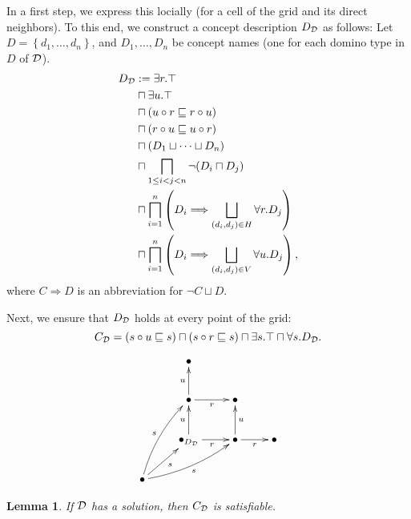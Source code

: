 \documentclass[openany]{scrbook}
\theoremstyle{break}
\newtheorem{Lemma}[Theorem]{Lemma}
\theoremstyle{nonumberbreak}
\theoremstyle{nonumberplain}
\theoremstyle{nonumberbreak}
\newcommand{\then}{\Longrightarrow}
\newcommand{\set}[1]{\left\{#1\right\}}
\begin{document}
In a first step, we express this locially (for a cell of the grid and
its direct neighbors). To this end, we construct a concept description
$D_{\cal D}$ as follows:
 Let $D = \set{d_1, \dotsc, d_n}$, and $D_1, \dotsc, D_n$ be concept
 names (one for each domino type in $D$ of ${\cal D}$).
 \begin{align*}
   D_{\cal D} & := \exists r.\top \\
   & \sqcap \exists u.\top \\
   & \sqcap (u \circ r \sqsubseteq r \circ u) \\
   & \sqcap (r \circ u \sqsubseteq u \circ r) \\
   & \sqcap (D_1 \sqcup \dotsb \sqcup D_n) \\
   & \sqcap \bigsqcap_{1 \leq i < j < n} \neg(D_i \sqcap D_j) \\
   & \sqcap \bigsqcap_{i = 1}^n \left(D_i \then \bigsqcup_{(d_i, d_j) \in
     H} \forall r. D_j\right) \\
   & \sqcap \bigsqcap_{i = 1}^n\left(D_i \then \bigsqcup_{(d_i, d_j)
       \in V} \forall u. D_j\right),
 \end{align*}
 where $C \then D$ is an abbreviation for $\neg C \sqcup D$.

 Next, we ensure that $D_{\cal D}$ holds at every point of the grid:
 \begin{equation*}
   C_{\cal D} = (s \circ u \sqsubseteq s) \sqcap (s \circ r
   \sqsubseteq s) \sqcap \exists s.\top \sqcap \forall s. D_{\cal D}.
 \end{equation*}

 \begin{equation*}
   \xymatrix{ & \bullet \\
     & \bullet \ar[u]^{u} \ar[r]_{r} & \bullet\\
     & \bullet_{D_{\cal D}} \ar[u]^{u} \ar[r]_{r} & \bullet \ar[u]_{u}
     \ar[r]_{r} & \bullet \\
   \bullet \ar[ur]_{s} \ar@/_/[urr]_{s} \ar@/^/[uur]^{s}}
 \end{equation*}

 \begin{Lemma}
   \label{7.3}
   If ${\cal D}$ has a solution, then $C_{\cal D}$ is satisfiable.
 \end{Lemma}
\end{document}
